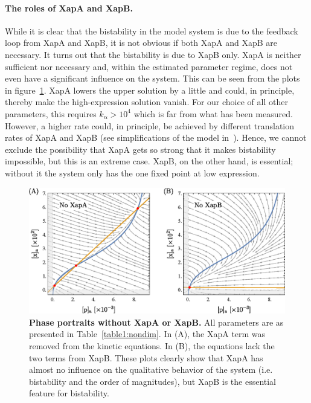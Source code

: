 \documentclass[10pt,letterpaper]{article}
\newcommand{\n}[1]{\mathrm{#1}}
\begin{document}
\paragraph*{The roles of XapA and XapB.}
While it is clear that the bistability in the model system is due to the
feedback loop from XapA and XapB, it is not obvious if both XapA and XapB
are necessary. It turns out that the bistability is due to XapB only. XapA
is neither sufficient nor necessary and, within the estimated parameter
regime, does not even have a significant influence on the system. This can
be seen from the plots in figure~\ref{fig6:xapAB}. XapA lowers the upper
solution by a little and could, in principle, thereby make the
high-expression solution vanish. For our choice of all other parameters,
this requires $k_{\n{\alpha}} > 10^4$ which is far from what has been
measured. However, a higher rate could, in principle, be achieved by
different translation rates of XapA and XapB (see simplifications of the
model in~). Hence, we cannot exclude the possibility that
XapA gets so strong that it makes bistability impossible, but this is an
extreme case. XapB, on the other hand, is essential; without it the system
only has the one fixed point at low expression.

\begin{figure}%
	\includegraphics[width=1\textwidth]{media/XapAB.eps}
	\centering
	\caption{{\bf Phase portraits without XapA or XapB.}
		All parameters are as presented in Table~\ref{table1:nondim}. In
		(A), the XapA term was removed from the kinetic equations. In (B),
		the equations lack the two terms from XapB. These plots clearly show
		that XapA has almost no influence on the qualitative behavior of the
		system (i.e. bistability and the order of magnitudes), but XapB is
		the essential feature for bistability.}
	\label{fig6:xapAB}
\end{figure}
\end{document}
